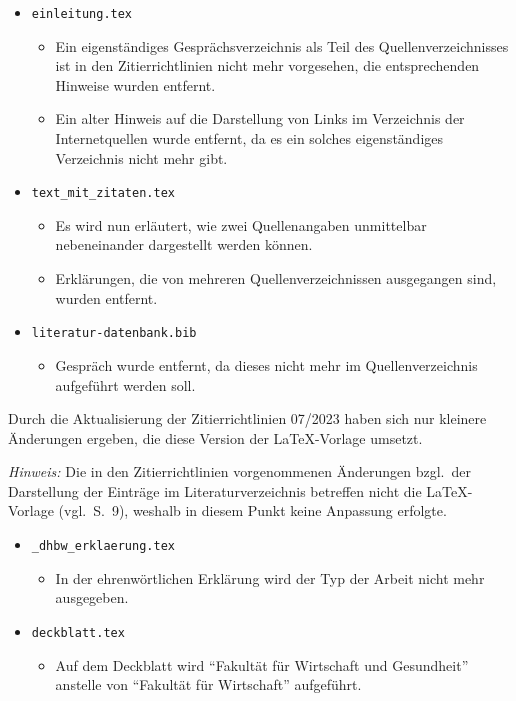 \begin{itemize}
\item \verb|einleitung.tex|
\begin{itemize}
\item Ein eigenständiges Gesprächsverzeichnis als Teil des Quellenverzeichnisses ist in den Zitierrichtlinien nicht mehr vorgesehen, die entsprechenden Hinweise wurden entfernt.
\item Ein alter Hinweis auf die Darstellung von Links im Verzeichnis der Internetquellen wurde entfernt, da es ein solches eigenständiges Verzeichnis nicht mehr gibt. 
\end{itemize}

\item \verb|text_mit_zitaten.tex|
\begin{itemize}
\item Es wird nun erläutert, wie zwei Quellenangaben unmittelbar nebeneinander dargestellt werden können.
\item Erklärungen, die von mehreren Quellenverzeichnissen ausgegangen sind, wurden entfernt.
\end{itemize}

\item \verb|literatur-datenbank.bib|
\begin{itemize}
\item Gespräch wurde entfernt, da dieses nicht mehr im Quellenverzeichnis aufgeführt werden soll.
\end{itemize}

\end{itemize}

\label{anhang:ReleaseNotes19}
Durch die Aktualisierung der Zitierrichtlinien 07/2023 haben sich nur kleinere Änderungen ergeben, die diese Version der \LaTeX-Vorlage umsetzt.

\emph{Hinweis:} Die in den Zitierrichtlinien vorgenommenen Änderungen bzgl.\ der Darstellung der Einträge im Literaturverzeichnis betreffen nicht die \LaTeX-Vorlage (vgl.\ S.\ 9), weshalb in diesem Punkt keine Anpassung erfolgte.

\begin{itemize}

\item \verb|_dhbw_erklaerung.tex|
\begin{itemize}
\item In der ehrenwörtlichen Erklärung wird der Typ der Arbeit nicht mehr ausgegeben.
\end{itemize}

\item \verb|deckblatt.tex|
\begin{itemize}
\item Auf dem Deckblatt wird \enquote{Fakultät für Wirtschaft und Gesundheit} anstelle von \enquote{Fakultät für Wirtschaft} aufgeführt.
\end{itemize}


\end{itemize}

